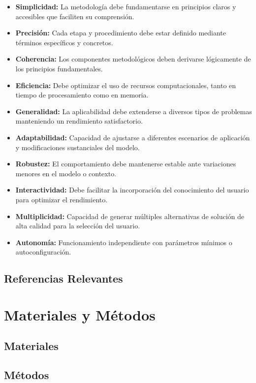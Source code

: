 \documentclass[12pt,titlepage,twoside,openright]{book}
\begin{document}
\begin{itemize}
	\item \textbf{Simplicidad:} La metodología debe fundamentarse en principios claros y accesibles que faciliten su comprensión.
	\item \textbf{Precisión:} Cada etapa y procedimiento debe estar definido mediante términos específicos y concretos.
	\item \textbf{Coherencia:} Los componentes metodológicos deben derivarse lógicamente de los principios fundamentales.
	\item \textbf{Eficiencia:} Debe optimizar el uso de recursos computacionales, tanto en tiempo de procesamiento como en memoria.
	\item \textbf{Generalidad:} La aplicabilidad debe extenderse a diversos tipos de problemas manteniendo un rendimiento satisfactorio.
	\item \textbf{Adaptabilidad:} Capacidad de ajustarse a diferentes escenarios de aplicación y modificaciones sustanciales del modelo.
	\item \textbf{Robustez:} El comportamiento debe mantenerse estable ante variaciones menores en el modelo o contexto.
	\item \textbf{Interactividad:} Debe facilitar la incorporación del conocimiento del usuario para optimizar el rendimiento.
	\item \textbf{Multiplicidad:} Capacidad de generar múltiples alternativas de solución de alta calidad para la selección del usuario.
	\item \textbf{Autonomía:} Funcionamiento independiente con parámetros mínimos o autoconfiguración.
\end{itemize}

\section{Referencias Relevantes}

\chapter{Materiales y Métodos}
\label{cap:materialesymetodos}

\section{Materiales}

\section{Métodos}
\end{document}
